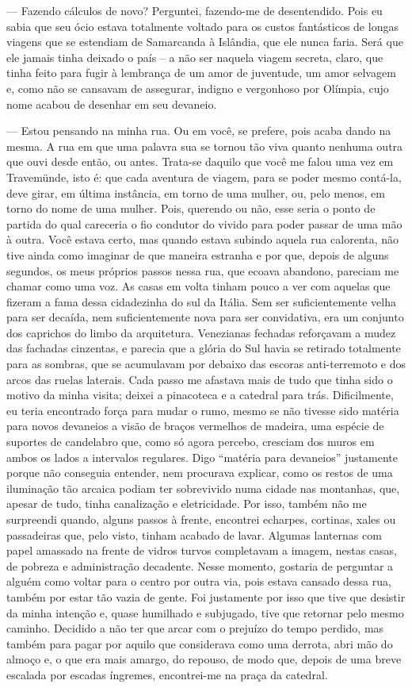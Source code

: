--- Fazendo cálculos de novo? Perguntei, fazendo-me de desentendido. Pois
eu sabia que seu ócio estava totalmente voltado para os custos
fantásticos de longas viagens que se estendiam de Samarcanda à Islândia,
que ele nunca faria. Será que ele jamais tinha deixado o país -- a não
ser naquela viagem secreta, claro, que tinha feito para fugir à
lembrança de um amor de juventude, um amor selvagem e, como não se
cansavam de assegurar, indigno e vergonhoso por Olímpia, cujo nome
acabou de desenhar em seu devaneio.

--- Estou pensando na minha rua. Ou em você, se prefere, pois acaba dando
na mesma. A rua em que uma palavra sua se tornou tão viva quanto nenhuma
outra que ouvi desde então, ou antes. Trata-se daquilo que você me falou
uma vez em Travemünde, isto é: que cada aventura de viagem, para se
poder mesmo contá-la, deve girar, em última instância, em torno de uma
mulher, ou, pelo menos, em torno do nome de uma mulher. Pois, querendo
ou não, esse seria o ponto de partida do qual careceria o fio condutor
do vivido para poder passar de uma mão à outra. Você estava certo, mas
quando estava subindo aquela rua calorenta, não tive ainda como imaginar
de que maneira estranha e por que, depois de alguns segundos, os meus
próprios passos nessa rua, que ecoava abandono, pareciam me chamar como
uma voz. As casas em volta tinham pouco a ver com aquelas que fizeram a
fama dessa cidadezinha do sul da Itália. Sem ser suficientemente velha
para ser decaída, nem suficientemente nova para ser convidativa, era um
conjunto dos caprichos do limbo da arquitetura. Venezianas fechadas
reforçavam a mudez das fachadas cinzentas, e parecia que a glória do Sul
havia se retirado totalmente para as sombras, que se acumulavam por
debaixo das escoras anti-terremoto e dos arcos das ruelas laterais. Cada
passo me afastava mais de tudo que tinha sido o motivo da minha visita;
deixei a pinacoteca e a catedral para trás. Dificilmente, eu teria
encontrado força para mudar o rumo, mesmo se não tivesse sido matéria
para novos devaneios a visão de braços vermelhos de madeira, uma espécie
de suportes de candelabro que, como só agora percebo, cresciam dos muros
em ambos os lados a intervalos regulares. Digo ``matéria para
devaneios'' justamente porque não conseguia entender, nem procurava
explicar, como os restos de uma iluminação tão arcaica podiam ter
sobrevivido numa cidade nas montanhas, que, apesar de tudo, tinha
canalização e eletricidade. Por isso, também não me surpreendi quando,
alguns passos à frente, encontrei echarpes, cortinas, xales ou
passadeiras que, pelo visto, tinham acabado de lavar. Algumas lanternas
com papel amassado na frente de vidros turvos completavam a imagem,
nestas casas, de pobreza e administração decadente. Nesse momento,
gostaria de perguntar a alguém como voltar para o centro por outra via,
pois estava cansado dessa rua, também por estar tão vazia de gente. Foi
justamente por isso que tive que desistir da minha intenção e, quase
humilhado e subjugado, tive que retornar pelo mesmo caminho. Decidido a
não ter que arcar com o prejuízo do tempo perdido, mas também para pagar
por aquilo que considerava como uma derrota, abri mão do almoço e, o que
era mais amargo, do repouso, de modo que, depois de uma breve escalada
por escadas íngremes, encontrei-me na praça da catedral.


